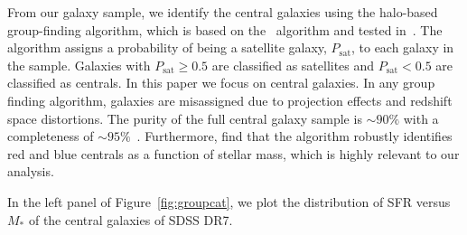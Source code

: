 \documentclass[12pt, letterpaper, preprint]{aastex}
\begin{document}
From our galaxy sample, we identify the central galaxies using the \cite{tinker2011} halo-based 
group-finding algorithm, which is based on the~\cite{yang2005} algorithm and tested 
in~\cite{campbell2015}. The algorithm assigns a probability of being a satellite 
galaxy, $P_\mathrm{sat}$, to each galaxy in the sample. Galaxies with $P_\mathrm{sat} \geq 0.5$ 
are classified as satellites and $P_\mathrm{sat} < 0.5$ are classified as centrals. 
In this paper we focus on central galaxies. In any group finding algorithm, galaxies are 
misassigned due to projection effects and redshift space distortions. The purity 
of the full central galaxy sample is $\sim 90\%$ with a completeness of $\sim 95\%$~\citep{tinker2017}.
Furthermore, \cite{campbell2015} find that the algorithm robustly identifies red and blue centrals
as a function of stellar mass, which is highly relevant to our analysis.  

In the left panel of Figure~\ref{fig:groupcat}, we plot the distribution of SFR versus $M_*$ 
of the central galaxies of SDSS DR7. 
\end{document}
